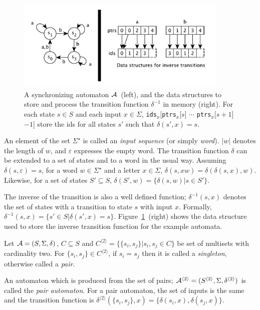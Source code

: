 \documentclass[12pt]{article}
\begin{document}
\begin{figure}[ht]
	\centering
	\includegraphics[width=0.9\textwidth]{figs/inverse.pdf}
	\caption{A synchronizing automaton ${\cal A}$~(left), and the data structures to store and process the transition function $\delta^{-1}$  in memory (right).
	For each state $s \in S$ and each input $x \in \Sigma$, {\tt ids}$_x$[{\tt ptrs}$_x$[$s$] $\cdots$ {\tt ptrs}$_x$[$s+1$] $ - 1$] store the ids for all states $s'$ such that $\delta(s',x) = s$.}
	\label{fig:inv}
\end{figure}

An element of the set $\Sigma^\star$ is called an {\em input sequence} (or simply {\em word}). $|w|$ denotes the length of $w$, and $\varepsilon$ expresses the empty word. The transition function $\delta$ can be extended to a set of states and to a word in the usual way. Assuming $\delta(s,\varepsilon)=s$, for a word $w \in \Sigma^\star$ and a letter $x \in \Sigma$, $\delta(s,xw) = \delta(\delta(s,x),w)$. Likewise, for a set of states $S' \subseteq S$, $\delta(S',w) = \{ \delta(s,w) | s \in S'\}$.

The inverse of the transition is also a well defined function; $\delta^{-1}(s,x)$ denotes the set of states with a transition to state $s$ with input $x$. Formally, $\delta^{-1}(s,x) = \{ s' \in S | \delta(s',x)= s\}$.  Figure~\ref{fig:inv}~(right) shows the data structure used to store the inverse transition function for the example automata.

Let ${\cal A}=(S, \Sigma, \delta)$, $C \subseteq S$ and $C^{\langle 2 \rangle} = \{ \{ s_i, s_j \}| s_i,s_j \in C \}$ be set of multisets  with cardinality two. For $\{ s_i, s_j \} \in C^{\langle 2 \rangle}$, if $s_i=s_j$ then it is called a \textit{singleton}, otherwise called a \textit{pair}. 

An automaton which is produced from the set of pairs; ${\cal A}^{\langle 2 \rangle}=(S^{\langle 2 \rangle},\Sigma,\delta^{\langle 2 \rangle})$ is called the \textit{pair automaton}. 
For a pair automaton, the set of inputs is the same and the transition function is $\delta^{\langle 2 \rangle}(\{ s_i,s_j \},x) = \{ \delta(s_i,x), \delta(s_j,x) \}$. 
\end{document}
